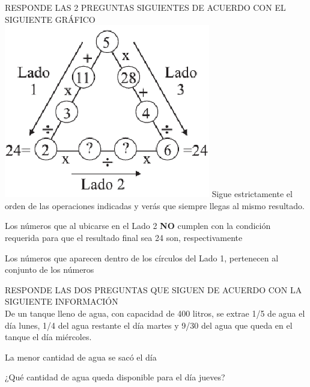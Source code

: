 \documentclass[letterpaper,10pt]{examdesign}
\begin{document}
\begin{multiplechoice}[keycolumns=4,examcolumns=2]
\begin{block}[questions=2]
RESPONDE LAS 2 PREGUNTAS SIGUIENTES DE ACUERDO CON EL SIGUIENTE
GRÁFICO\\
\hspace*{1cm}\includegraphics[scale=.55]{Images/triangulonum.png}
Sigue estrictamente el orden de las operaciones indicadas y verás que siempre llegas al mismo resultado.
\begin{question}
Los números que al ubicarse en el Lado 2 \textbf{NO} cumplen con la condición requerida para que el resultado final sea 24 son, respectivamente
\end{question}
\begin{question}
Los números que aparecen dentro de los círculos del Lado 1, pertenecen al conjunto de los números
\end{question}
\end{block}
\begin{block}[questions=2]
RESPONDE LAS DOS PREGUNTAS QUE SIGUEN DE ACUERDO CON LA SIGUIENTE INFORMACIÓN\\
De un tanque lleno de agua, con capacidad de 400 litros, se extrae 1/5  de agua el día lunes, 1/4 del agua restante el día martes y 9/30 del agua que queda en el tanque el día miércoles.
\begin{question}
La menor cantidad de agua se sacó el día
\end{question}
\begin{question}
¿Qué cantidad de agua queda disponible para el día jueves?

\end{question}
\end{block}
\end{multiplechoice}
\end{document}
